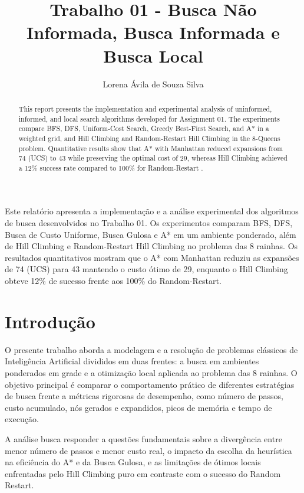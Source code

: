 \documentclass[12pt]{article}
\title{Trabalho 01 - Busca Não Informada, Busca Informada e Busca Local}
\author{Lorena Ávila de Souza Silva\inst{1}}
\begin{document}
\maketitle

\begin{abstract}
This report presents the implementation and experimental analysis of uninformed, informed, and local search algorithms developed for Assignment 01. The experiments compare BFS, DFS, Uniform-Cost Search, Greedy Best-First Search, and A* in a weighted grid, and Hill Climbing and Random-Restart Hill Climbing in the 8-Queens problem. Quantitative results show that A* with Manhattan reduced expansions from 74 (UCS) to 43 while preserving the optimal cost of 29, whereas Hill Climbing achieved a 12\% success rate compared to 100\% for Random-Restart \cite{russell2021}.
\end{abstract}

\begin{resumo}
Este relatório apresenta a implementação e a análise experimental dos algoritmos de busca desenvolvidos no Trabalho 01. Os experimentos comparam BFS, DFS, Busca de Custo Uniforme, Busca Gulosa e A* em um ambiente ponderado, além de Hill Climbing e Random-Restart Hill Climbing no problema das 8 rainhas. Os resultados quantitativos mostram que o A* com Manhattan reduziu as expansões de 74 (UCS) para 43 mantendo o custo ótimo de 29, enquanto o Hill Climbing obteve 12\% de sucesso frente aos 100\% do Random-Restart.
\end{resumo}

\section{Introdução}
O presente trabalho aborda a modelagem e a resolução de problemas clássicos de Inteligência Artificial divididos em duas frentes: a busca em ambientes ponderados em grade e a otimização local aplicada ao problema das 8 rainhas. O objetivo principal é comparar o comportamento prático de diferentes estratégias de busca frente a métricas rigorosas de desempenho, como número de passos, custo acumulado, nós gerados e expandidos, picos de memória e tempo de execução.

A análise busca responder a questões fundamentais sobre a divergência entre menor número de passos e menor custo real, o impacto da escolha da heurística na eficiência do A* e da Busca Gulosa, e as limitações de ótimos locais enfrentadas pelo Hill Climbing puro em contraste com o sucesso do Random Restart.
\end{document}
